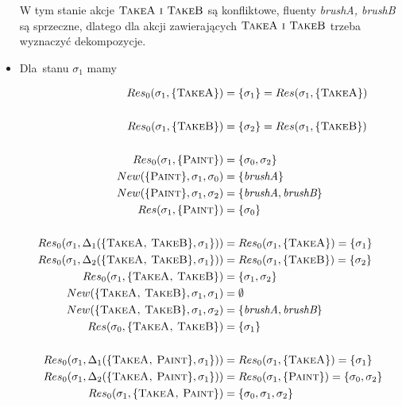 \documentclass[11pt,a4paper]{article}
\begin{document}
\begin{itemize}
	W tym stanie akcje $\textsc{TakeA i TakeB}$ są konfliktowe, fluenty \textit{brushA, brushB} są sprzeczne, dlatego dla akcji zawierających $\textsc{TakeA i TakeB}$ trzeba wyznaczyć dekompozycje.
	\newpage
    \item Dla~stanu $\sigma_1$ mamy
    
    \begin{align*}
		Res_0(\sigma_1, \{ \textsc{TakeA} \}) &= \{ \sigma_1 \} = Res(\sigma_1, \{ \textsc{TakeA} \}) \\
        \\
    	Res_0(\sigma_1, \{ \textsc{TakeB} \}) &= \{ \sigma_2 \} = Res(\sigma_1, \{ \textsc{TakeB} \}) \\
    	\\
    	Res_0(\sigma_1, \{ \textsc{Paint} \}) &= \{ \sigma_0, \sigma_2 \}  \\
    	New(\{ \textsc{Paint} \}, \sigma_1, \sigma_0) &=  \{ \textit{brushA} \} \\    
    	New(\{ \textsc{Paint} \}, \sigma_1, \sigma_2) &=  \{ \textit{brushA}, \textit{brushB}\} \\   
    	Res(\sigma_1, \{ \textsc{Paint} \}) &= \{ \sigma_0 \} \\ 
    	\\
    	Res_0(\sigma_1, \Delta_1(\{\textsc{TakeA, TakeB} \}, \sigma_1 \})) &= Res_0(\sigma_1, \{ \textsc{TakeA} \}) = \{ \sigma_1 \} \\
    	Res_0(\sigma_1, \Delta_2(\{\textsc{TakeA, TakeB} \}, \sigma_1 \})) &= Res_0(\sigma_1, \{ \textsc{TakeB} \}) = \{ \sigma_2 \} \\
		Res_0(\sigma_1, \{\textsc{TakeA, TakeB} \}) &= \{ \sigma_1, \sigma_2 \} \\  
        New(\{\textsc{TakeA, TakeB} \}, \sigma_1, \sigma_1) &=  \emptyset \\    
		New(\{\textsc{TakeA, TakeB} \}, \sigma_1, \sigma_2) &=  \{ \textit{brushA}, \textit{brushB} \} \\    
        Res(\sigma_0, \{\textsc{TakeA, TakeB} \}) &= \{ \sigma_1 \} \\   
        \\             
    	Res_0(\sigma_1, \Delta_1(\{\textsc{TakeA, Paint} \}, \sigma_1 \})) &= Res_0(\sigma_1, \{ \textsc{TakeA} \}) = \{ \sigma_1 \} \\
    	Res_0(\sigma_1, \Delta_2(\{\textsc{TakeA, Paint} \}, \sigma_1 \})) &= Res_0(\sigma_1, \{ \textsc{Paint} \}) = \{ \sigma_0, \sigma_2 \} \\
		Res_0(\sigma_1, \{\textsc{TakeA, Paint} \}) &= \{ \sigma_0, \sigma_1, \sigma_2 \} \\  

\end{align*}
\end{itemize}
\end{document}
